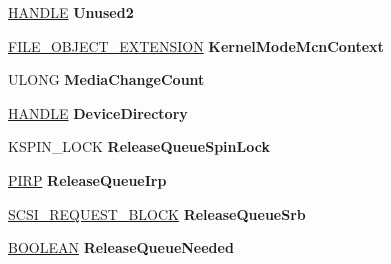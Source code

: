 \begin{DoxyCompactItemize}
\hyperlink{interfacevoid}{H\+A\+N\+D\+LE} {\bfseries Unused2}
\item 
\mbox{\label{struct___f_u_n_c_t_i_o_n_a_l___d_e_v_i_c_e___e_x_t_e_n_s_i_o_n_a9c3ac5521b7ef591714f127d27626f7b}} 
\hyperlink{struct___f_i_l_e___o_b_j_e_c_t___e_x_t_e_n_s_i_o_n}{F\+I\+L\+E\+\_\+\+O\+B\+J\+E\+C\+T\+\_\+\+E\+X\+T\+E\+N\+S\+I\+ON} {\bfseries Kernel\+Mode\+Mcn\+Context}
\item 
\mbox{\label{struct___f_u_n_c_t_i_o_n_a_l___d_e_v_i_c_e___e_x_t_e_n_s_i_o_n_a2d6ad8e2413d162682ae7aa02c79689b}} 
U\+L\+O\+NG {\bfseries Media\+Change\+Count}
\item 
\mbox{\label{struct___f_u_n_c_t_i_o_n_a_l___d_e_v_i_c_e___e_x_t_e_n_s_i_o_n_a67d1269e05f7b6c1c779bba0c21e90ea}} 
\hyperlink{interfacevoid}{H\+A\+N\+D\+LE} {\bfseries Device\+Directory}
\item 
\mbox{\label{struct___f_u_n_c_t_i_o_n_a_l___d_e_v_i_c_e___e_x_t_e_n_s_i_o_n_a237777460dedd5cc73591de9684c291e}} 
K\+S\+P\+I\+N\+\_\+\+L\+O\+CK {\bfseries Release\+Queue\+Spin\+Lock}
\item 
\mbox{\label{struct___f_u_n_c_t_i_o_n_a_l___d_e_v_i_c_e___e_x_t_e_n_s_i_o_n_a61a6ebd88e4d26459f424d9c7c5b27bf}} 
\hyperlink{interfacevoid}{P\+I\+RP} {\bfseries Release\+Queue\+Irp}
\item 
\mbox{\label{struct___f_u_n_c_t_i_o_n_a_l___d_e_v_i_c_e___e_x_t_e_n_s_i_o_n_a9281d1f7807bf0f63d5005b54c984f28}} 
\hyperlink{struct___s_c_s_i___r_e_q_u_e_s_t___b_l_o_c_k}{S\+C\+S\+I\+\_\+\+R\+E\+Q\+U\+E\+S\+T\+\_\+\+B\+L\+O\+CK} {\bfseries Release\+Queue\+Srb}
\item 
\mbox{\label{struct___f_u_n_c_t_i_o_n_a_l___d_e_v_i_c_e___e_x_t_e_n_s_i_o_n_a1954ad0d02bbc869bd3433e229fb09f6}} 
\hyperlink{_processor_bind_8h_a112e3146cb38b6ee95e64d85842e380a}{B\+O\+O\+L\+E\+AN} {\bfseries Release\+Queue\+Needed}

\end{DoxyCompactItemize}
